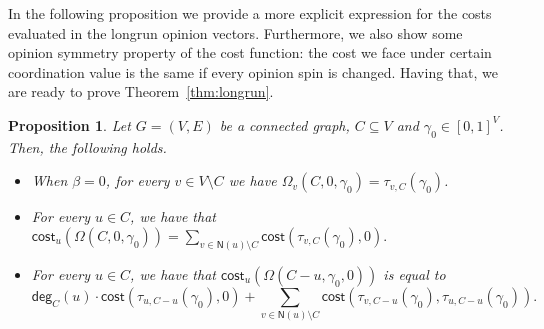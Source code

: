 \documentclass[letterpaper,11pt]{article}
\newcommand{\nsf}{\mathsf{N}}
\newcommand{\cost}{\mathsf{cost}}
\newcommand{\degsf}{\mathsf{deg}}
\newtheorem{proposition}{Proposition}
\begin{document}
In the following proposition we provide a more explicit expression for the costs evaluated in the longrun opinion vectors.
Furthermore, we also show some opinion symmetry property of the cost function: the cost we face under certain coordination value is the same if every opinion spin is changed. 
Having that, we are ready to prove Theorem~\ref{thm:longrun}.

\begin{proposition}
\label{prop:properties}
Let $G=(V,E)$ be a connected graph, $C\subseteq V$ and $\gamma_0\in [0,1]^V$.
Then, the following holds.
\begin{itemize}
	\item[$(a)$] When $\beta=0$, for every $v\in V\setminus C$ we have $\Omega_v(C,0,\gamma_0)=\tau_{v,C}(\gamma_0)$.
	\item[$(b)$]  For every $u\in C$, we have that 
 $\displaystyle \cost_u(\Omega(C,0,\gamma_0))=\sum_{v\in \nsf(u)\setminus C}\cost(\tau_{v,C}(\gamma_0),0).$
	\item[$(c)$]  For every $u\in C$, we have that $\cost_u(\Omega({C-u},\gamma_0,0))$ is equal to
\begin{equation*}
\degsf_C(u)\cdot \cost(\tau_{u,C-u}(\gamma_0),0)+\sum_{v\in \nsf(u)\setminus C}\cost(\tau_{v,C-u}(\gamma_0),\tau_{u,C-u}(\gamma_0)).
\end{equation*}
\end{itemize}
\end{proposition}
\end{document}
